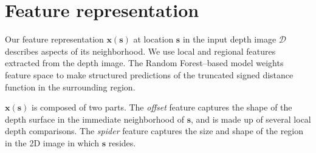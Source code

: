 \documentclass[10pt,twocolumn,letterpaper]{article}
\newcommand{\feat}{\mathbf{x}}
\newcommand{\rgbdimage}{\mathcal{D}}
\newcommand{\pixelidx}{\mathbf{s}}
\newcommand{\note}[1]{\textcolor{blue}{NOTE: #1}}
\begin{document}
\section{Feature representation}
\label{sec:features}

\newcommand{\scalfeat}{x}

Our feature representation $\feat(\pixelidx)$ at location $\pixelidx$ in the input depth image $\rgbdimage$  describes aspects of its neighborhood.
We use local and regional features extracted from the depth image.
The Random Forest--based model weights feature space to make structured predictions of the truncated signed distance function in the surrounding region.

$\feat(\pixelidx)$ is composed of two parts.
The \emph{offset} feature captures the shape of the depth surface in the immediate neighborhood of $\pixelidx$, and is made up of several local depth comparisons.
The \emph{spider} feature captures the size and shape of the region in the 2D image in which $\pixelidx$ resides.

\end{document}
